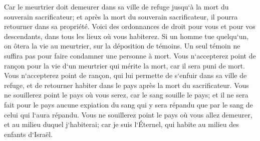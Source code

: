 \verse Car le meurtrier doit demeurer dans sa ville de refuge jusqu`à la mort du souverain sacrificateur; et après la mort du souverain sacrificateur, il pourra retourner dans sa propriété. 
\verse Voici des ordonnances de droit pour vous et pour vos descendants, dans tous les lieux où vous habiterez. 
\verse Si un homme tue quelqu`un, on ôtera la vie au meurtrier, sur la déposition de témoins. Un seul témoin ne suffira pas pour faire condamner une personne à mort. 
\verse Vous n`accepterez point de rançon pour la vie d`un meurtrier qui mérite la mort, car il sera puni de mort. 
\verse Vous n`accepterez point de rançon, qui lui permette de s`enfuir dans sa ville de refuge, et de retourner habiter dans le pays après la mort du sacrificateur. 
\verse Vous ne souillerez point le pays où vous serez, car le sang souille le pays; et il ne sera fait pour le pays aucune expiation du sang qui y sera répandu que par le sang de celui qui l`aura répandu. 
\verse Vous ne souillerez point le pays où vous allez demeurer, et au milieu duquel j`habiterai; car je suis l`Éternel, qui habite au milieu des enfants d`Israël. 

